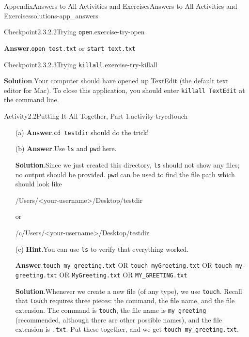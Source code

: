 \documentclass[oneside,10pt,]{book}
\newcommand{\blocktitlefont}{\relax}
\newcommand{\mono}[1]{\texttt{#1}}
\begin{document}
\begin{solutions-chapter}{Appendix}{Answers to All Activities and Exercises}{}{Answers to All Activities and Exercises}{}{}{solutions-app_answers}
\begin{inlinesolution}{Checkpoint}{2.3.2.2}{Trying \mono{open}.}{exercise-try-open}
\par\smallskip%
\noindent\textbf{\blocktitlefont Answer}.\hypertarget{answer-try-open-c-back}{}\quad{}\mono{open test.txt} or \mono{start text.txt}%
\end{inlinesolution}%
\begin{inlinesolution}{Checkpoint}{2.3.2.3}{Trying \mono{killall}.}{exercise-try-killall}%
\par\smallskip%
\noindent\textbf{\blocktitlefont Solution}.\hypertarget{solution-try-killall-c-back}{}\quad{}Your computer should have opened up TextEdit (the default text editor for Mac). To close this application, you should enter \mono{killall TextEdit} at the command line.%
\end{inlinesolution}%
\begin{activitysolution}{Activity}{2.2}{Putting It All Together, Part 1.}{activity-trycdtouch}%
\begin{enumerate}[font=\bfseries,label=(\alph*),ref=\alph*]%
\item[(a)]\noindent\textbf{\blocktitlefont Answer}.\hypertarget{answer-trycdtouch-d-b-back}{}\quad{}\mono{cd testdir} should do the trick!%
\item[(b)]\noindent\textbf{\blocktitlefont Answer}.\hypertarget{answer-trycdtouch-e-b-back}{}\quad{}Use \mono{ls} and \mono{pwd} here.%
\par\smallskip%
\noindent\textbf{\blocktitlefont Solution}.\hypertarget{solution-trycdtouch-e-c-back}{}\quad{}Since we just created this directory, \mono{ls} should not show any files; no output should be provided. \mono{pwd} can be used to find the file path which should look like%
\begin{codedisplay}
/Users/<your-username>/Desktop/testdir
\end{codedisplay}
or%
\begin{codedisplay}
/c/Users/<your-username>/Desktop/testdir
\end{codedisplay}
%
\item[(c)]\noindent\textbf{\blocktitlefont Hint}.\hypertarget{hint-trycdtouch-f-b-back}{}\quad{}You can use \mono{ls} to verify that everything worked.%
\par\smallskip%
\noindent\textbf{\blocktitlefont Answer}.\hypertarget{answer-trycdtouch-f-c-back}{}\quad{}\mono{touch my\_greeting.txt} OR \mono{touch myGreeting.txt} OR \mono{touch my-greeting.txt} OR \mono{MyGreeting.txt} OR \mono{MY\_GREETING.txt}%
\par\smallskip%
\noindent\textbf{\blocktitlefont Solution}.\hypertarget{solution-trycdtouch-f-d-back}{}\quad{}Whenever we create a new file (of any type), we use \mono{touch}. Recall that \mono{touch} requires three pieces: the command, the file name, and the file extension. The command is \mono{touch}, the file name is \mono{my\_greeting} (recommended, although there are other possible names), and the file extension is \mono{.txt}. Put these together, and we get \mono{touch my\_greeting.txt}.%

\end{enumerate}
\end{activitysolution}
\end{solutions-chapter}
\end{document}
